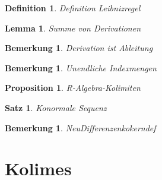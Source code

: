 \documentclass[10pt,a4paper]{report}
\newcounter{Aussage}[chapter]
\newtheorem{satz}[Aussage]{Satz}
\newtheorem{prop}[Aussage]{Proposition}
\newtheorem{lemma}[Aussage]{Lemma}
\newtheorem{bem}[Aussage]{Bemerkung}
\newtheorem{definition}[Aussage]{Definition}
\begin{document}
\begin{definition}\label{Definition Leibnizregel}
Definition Leibnizregel
\end{definition}

\begin{lemma}\label{Summe von Derivationen}
Summe von Derivationen
\end{lemma}

\begin{bem}\label{Derivation ist Ableitung}
Derivation ist Ableitung
\end{bem}

\begin{bem}\label{Unendliche Indexmengen}
Unendliche Indexmengen
\end{bem}

\begin{prop}\label{R-Algebra-Kolimiten}
R-Algebra-Kolimiten
\end{prop}

\begin{satz}\label{Konormale Sequenz}
Konormale Sequenz
\end{satz}

\begin{bem}\label{NeuDifferenzenkokerndef}
NeuDifferenzenkokerndef
\end{bem}

\chapter{Kolimes}
\end{document}
